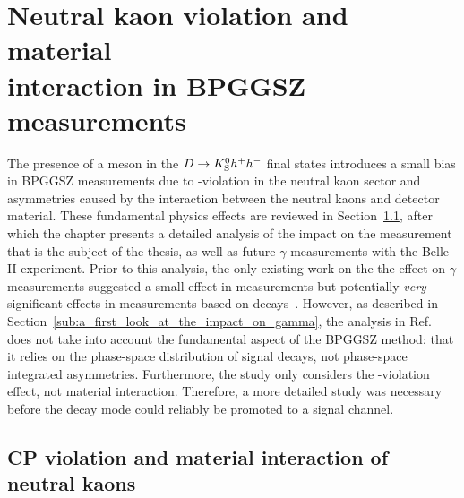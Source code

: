 

\chapter{\texorpdfstring{Neutral kaon \CP violation and material\\interaction in BPGGSZ measurements}{Neutral kaon CP violation and material interaction in BPGGSZ measurements}}
\label{ch:4-KS-CPV}

The presence of a \KS meson in the ${D}\rightarrow{\ensuremath{{K}^0_{\mathrm{S}}}} h^+h^-$ final states introduces a small bias in BPGGSZ measurements due to \CP-violation in the neutral kaon sector and asymmetries caused by the interaction between the neutral kaons and detector material. These fundamental physics effects are reviewed in Section~\ref{sec:cp_violation_and_material_interaction_of_neutral_kaons}, after which the chapter presents a detailed analysis of the impact on the \lhcb measurement that is the subject of the thesis,  as well as future $\gamma$ measurements with the Belle II experiment. 
Prior to this analysis, the only existing work on the the effect on $\gamma$ measurements suggested a small effect in \BtoDK measurements but potentially \emph{very} significant effects in measurements based on \BtoDpi decays~\cite{grossmanEffectsBarMixing2014}. However, as described in Section~\ref{sub:a_first_look_at_the_impact_on_gamma}, the analysis in Ref.~\cite{grossmanEffectsBarMixing2014} does not take into account the fundamental aspect of the BPGGSZ method: that it relies on the phase-space distribution of signal decays, not phase-space integrated asymmetries. Furthermore, the study only considers the \CP-violation effect, not material interaction. Therefore, a more detailed study was necessary before the \BtoDpi decay mode could reliably be promoted to a signal channel.



\section{CP violation and material interaction of neutral kaons} %
\label{sec:cp_violation_and_material_interaction_of_neutral_kaons}

